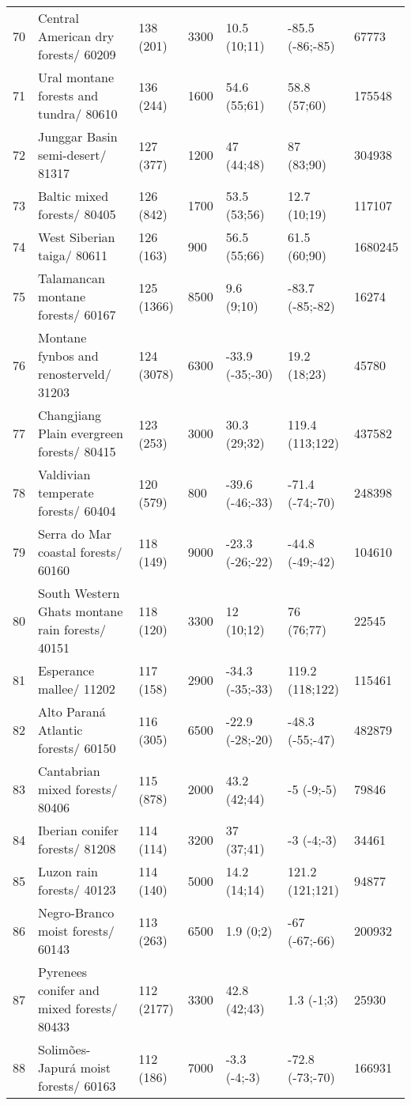 \begin{table}[ht]
\begin{tabular}{rllllll}
  70 & Central American dry forests/ 60209 & 138 (201) & 3300 & 10.5 (10;11) & -85.5 (-86;-85) & 67773 \\ 
  71 & Ural montane forests and tundra/ 80610 & 136 (244) & 1600 & 54.6 (55;61) & 58.8 (57;60) & 175548 \\ 
  72 & Junggar Basin semi-desert/ 81317 & 127 (377) & 1200 & 47 (44;48) & 87 (83;90) & 304938 \\ 
  73 & Baltic mixed forests/ 80405 & 126 (842) & 1700 & 53.5 (53;56) & 12.7 (10;19) & 117107 \\ 
  74 & West Siberian taiga/ 80611 & 126 (163) & 900 & 56.5 (55;66) & 61.5 (60;90) & 1680245 \\ 
  75 & Talamancan montane forests/ 60167 & 125 (1366) & 8500 & 9.6 (9;10) & -83.7 (-85;-82) & 16274 \\ 
  76 & Montane fynbos and renosterveld/ 31203 & 124 (3078) & 6300 & -33.9 (-35;-30) & 19.2 (18;23) & 45780 \\ 
  77 & Changjiang Plain evergreen forests/ 80415 & 123 (253) & 3000 & 30.3 (29;32) & 119.4 (113;122) & 437582 \\ 
  78 & Valdivian temperate forests/ 60404 & 120 (579) & 800 & -39.6 (-46;-33) & -71.4 (-74;-70) & 248398 \\ 
  79 & Serra do Mar coastal forests/ 60160 & 118 (149) & 9000 & -23.3 (-26;-22) & -44.8 (-49;-42) & 104610 \\ 
  80 & South Western Ghats montane rain forests/ 40151 & 118 (120) & 3300 & 12 (10;12) & 76 (76;77) & 22545 \\ 
  81 & Esperance mallee/ 11202 & 117 (158) & 2900 & -34.3 (-35;-33) & 119.2 (118;122) & 115461 \\ 
  82 & Alto Paraná Atlantic forests/ 60150 & 116 (305) & 6500 & -22.9 (-28;-20) & -48.3 (-55;-47) & 482879 \\ 
  83 & Cantabrian mixed forests/ 80406 & 115 (878) & 2000 & 43.2 (42;44) & -5 (-9;-5) & 79846 \\ 
  84 & Iberian conifer forests/ 81208 & 114 (114) & 3200 & 37 (37;41) & -3 (-4;-3) & 34461 \\ 
  85 & Luzon rain forests/ 40123 & 114 (140) & 5000 & 14.2 (14;14) & 121.2 (121;121) & 94877 \\ 
  86 & Negro-Branco moist forests/ 60143 & 113 (263) & 6500 & 1.9 (0;2) & -67 (-67;-66) & 200932 \\ 
  87 & Pyrenees conifer and mixed forests/ 80433 & 112 (2177) & 3300 & 42.8 (42;43) & 1.3 (-1;3) & 25930 \\ 
  88 & Solimões-Japurá moist forests/ 60163 & 112 (186) & 7000 & -3.3 (-4;-3) & -72.8 (-73;-70) & 166931 \\ 

\end{tabular}
\end{table}
